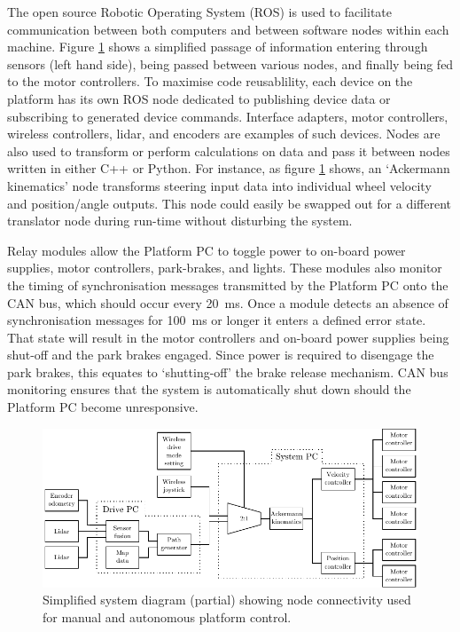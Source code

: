 \documentclass[preprint,authoryear,12pt]{elsarticle}
\begin{document}
        The open source Robotic Operating System (ROS) is used to facilitate communication between both computers and between software nodes within each machine.
        Figure \ref{fig:system_diagram_software} shows a simplified passage of information entering through sensors (left hand side), being passed between various nodes, and finally being fed to the motor controllers.
        To maximise code reusablility, each device on the platform has its own ROS node dedicated to publishing device data or subscribing to generated device commands.
        Interface adapters, motor controllers, wireless controllers, lidar, and encoders are examples of such devices.
        Nodes are also used to transform or perform calculations on data and pass it between nodes written in either C++ or Python.
        For instance, as figure \ref{fig:system_diagram_software} shows, an `Ackermann kinematics' node transforms steering input data into individual wheel velocity and position/angle outputs.
        This node could easily be swapped out for a different translator node during run-time without disturbing the system.

        Relay modules allow the Platform PC to toggle power to on-board power supplies, motor controllers, park-brakes, and lights.
        These modules also monitor the timing of synchronisation messages transmitted by the Platform PC onto the CAN bus, which should occur every \SI{20}{\milli\second}.
        Once a module detects an absence of synchronisation messages for \SI{100}{\milli\second} or longer it enters a defined error state.
        That state will result in the motor controllers and on-board power supplies being shut-off and the park brakes engaged.
        Since power is required to disengage the park brakes, this equates to `shutting-off' the brake release mechanism.
        CAN bus monitoring ensures that the system is automatically shut down should the Platform PC become unresponsive.

        \begin{figure}[htb]
            \centering
            \includegraphics[width=\linewidth]{imgs/system_diagram/software.pdf}
            \caption{Simplified system diagram (partial) showing node connectivity used for manual and autonomous platform control.}
            \label{fig:system_diagram_software}
        \end{figure}
\end{document}
